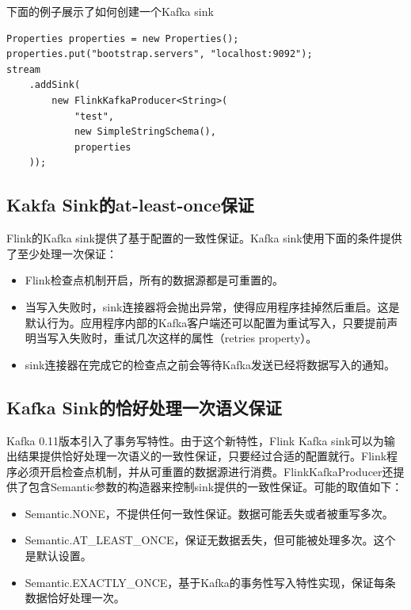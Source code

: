 \documentclass[cn,11pt,chinese]{elegantbook}
\begin{document}
下面的例子展示了如何创建一个Kafka sink

\begin{verbatim}
Properties properties = new Properties();
properties.put("bootstrap.servers", "localhost:9092");
stream
    .addSink(
        new FlinkKafkaProducer<String>(
            "test",
            new SimpleStringSchema(),
            properties
    ));
\end{verbatim}

\subsection{Kakfa Sink的at-least-once保证}

Flink的Kafka sink提供了基于配置的一致性保证。Kafka sink使用下面的条件提供了至少处理一次保证：

\begin{itemize}
    \item Flink检查点机制开启，所有的数据源都是可重置的。
    \item 当写入失败时，sink连接器将会抛出异常，使得应用程序挂掉然后重启。这是默认行为。应用程序内部的Kafka客户端还可以配置为重试写入，只要提前声明当写入失败时，重试几次这样的属性（retries property）。
    \item sink连接器在完成它的检查点之前会等待Kafka发送已经将数据写入的通知。
\end{itemize}

\subsection{Kafka Sink的恰好处理一次语义保证}

Kafka 0.11版本引入了事务写特性。由于这个新特性，Flink Kafka sink可以为输出结果提供恰好处理一次语义的一致性保证，只要经过合适的配置就行。Flink程序必须开启检查点机制，并从可重置的数据源进行消费。FlinkKafkaProducer还提供了包含Semantic参数的构造器来控制sink提供的一致性保证。可能的取值如下：

\begin{itemize}
    \item Semantic.NONE，不提供任何一致性保证。数据可能丢失或者被重写多次。
    \item Semantic.AT\_LEAST\_ONCE，保证无数据丢失，但可能被处理多次。这个是默认设置。
    \item Semantic.EXACTLY\_ONCE，基于Kafka的事务性写入特性实现，保证每条数据恰好处理一次。
\end{itemize}
\end{document}
